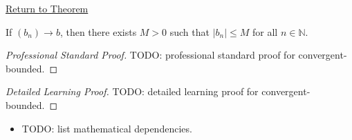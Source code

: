 \newpage
{}
\label{prf:convergent-bounded}

\begin{remark*}[Return]
\hyperref[prop:convergent-bounded]{Return to Theorem}
\end{remark*}

\begin{proposition*}
If $(b_n)\to b$, then there exists $M>0$ such that $|b_n|\leq M$ for all
$n\in\mathbb{N}$.
\end{proposition*}

\begin{proof}[Professional Standard Proof]
\LRAProofBodyStart
TODO: professional standard proof for convergent-bounded.
\end{proof}

\begin{proof}[Detailed Learning Proof]
\LRAProofBodyStart
TODO: detailed learning proof for convergent-bounded.
\end{proof}

\begin{remark*}
\end{remark*}

\begin{dependencies}
\begin{itemize}
  \item TODO: list mathematical dependencies.
\end{itemize}
\end{dependencies}

\clearpage
